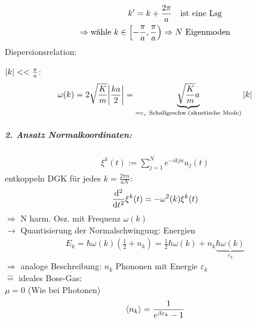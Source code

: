 \begin{align}
    k'=k+\frac{2\pi}{a} \qq{ist eine Lsg}\\
    \Rightarrow \text{wähle }k\in \left[-\frac{\pi}{a},\frac{\pi}{a}\right) \Rightarrow N\text{ Eigenmoden}
\end{align}
Dispersionsrelation:
\begin{center}
\end{center}
$\abs{k}<<\frac{\pi}{a}$:
\begin{align}
    \omega (k)= 2\sqrt{\frac{K}{m}}\abs{\frac{ka}{2}} = \underbrace{\sqrt{\frac{K}{m}} a}_{=c_s \text{ Schallgeschw.(akustische Mode)}} \abs{k}
\end{align}

\subparagraph{2. Ansatz Normalkoordinaten:}
\begin{align}
    \xi^k(t):=\sum_{j=1}^Ne^{-ikja} u_j(t)
\end{align}
entkoppeln DGK für jedes $k=\frac{2\pi n}{aN}$:
\begin{align}
    \dv[2]{}{t}\xi^k(t)=-\omega^2(k)\xi^k(t)
\end{align}
$\Rightarrow$ N harm. Osz. mit Frequenz $\omega(k)$\\
$\longrightarrow$ Quantisierung der Normalschwingung:
Energien
\begin{align}
    E_k=\hbar\omega (k) \left(\frac{1}{2} + n_k\right) = \frac{1}{2} \hbar \omega (k) + n_k \underbrace{ \hbar\omega (k)}_{\varepsilon_k}
\end{align}
$\Rightarrow$ analoge Beschreibung: $n_k$ Phononen mit Energie $\varepsilon_k$\\
$\widehat{=}$ ideales Bose-Gas:\\
$\mu = 0$ (Wie bei Photonen)\\
\begin{align}
    \expval{n_k}=\frac{1}{e^{\beta \varepsilon_k}-1}
\end{align}

